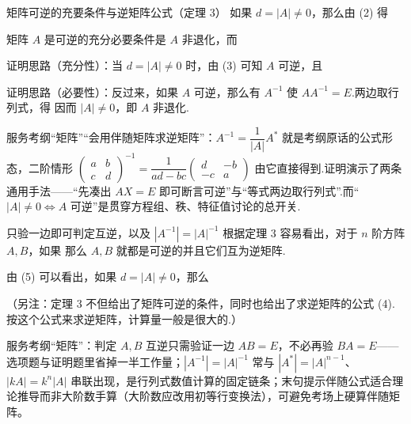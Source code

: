 \begin{fdeep}{矩阵可逆的充要条件与逆矩阵公式（定理 3）}
如果 $d=|A|\ne 0$，那么由 (2) 得

\quad 矩阵 $A$ 是可逆的充分必要条件是 $A$ 非退化，而

证明思路（充分性）：当 $d=|A|\ne 0$ 时，由 (3) 可知 $A$ 可逆，且

证明思路（必要性）：反过来，如果 $A$ 可逆，那么有 $A^{-1}$ 使 $AA^{-1}=E$.两边取行列式，得
因而 $|A|\ne 0$，即 $A$ 非退化.

\fbref{}服务考纲“矩阵”“会用伴随矩阵求逆矩阵”：$A^{-1}=\dfrac{1}{|A|}A^{*}$ 就是考纲原话的公式形态，二阶情形 $\begin{pmatrix}a&b\\c&d\end{pmatrix}^{-1}=\dfrac{1}{ad-bc}\begin{pmatrix}d&-b\\-c&a\end{pmatrix}$ 由它直接得到.证明演示了两条通用手法——“先凑出 $AX=E$ 即可断言可逆”与“等式两边取行列式”.而“$|A|\ne0\Leftrightarrow A$ 可逆”是贯穿方程组、秩、特征值讨论的总开关.
\end{fdeep}

\begin{fdeep}{只验一边即可判定互逆，以及 $|A^{-1}|=|A|^{-1}$}
根据定理 3 容易看出，对于 $n$ 阶方阵 $A,B$，如果
那么 $A,B$ 就都是可逆的并且它们互为逆矩阵.

由 (5) 可以看出，如果 $d=|A|\ne 0$，那么

（另注：定理 3 不但给出了矩阵可逆的条件，同时也给出了求逆矩阵的公式 (4).按这个公式来求逆矩阵，计算量一般是很大的.）

\fbref{}服务考纲“矩阵”：判定 $A,B$ 互逆只需验证一边 $AB=E$，不必再验 $BA=E$——选项题与证明题里省掉一半工作量；$|A^{-1}|=|A|^{-1}$ 常与 $|A^{*}|=|A|^{n-1}$、$|kA|=k^{n}|A|$ 串联出现，是行列式数值计算的固定链条；末句提示伴随公式适合理论推导而非大阶数手算（大阶数应改用初等行变换法），可避免考场上硬算伴随矩阵。
\end{fdeep}

